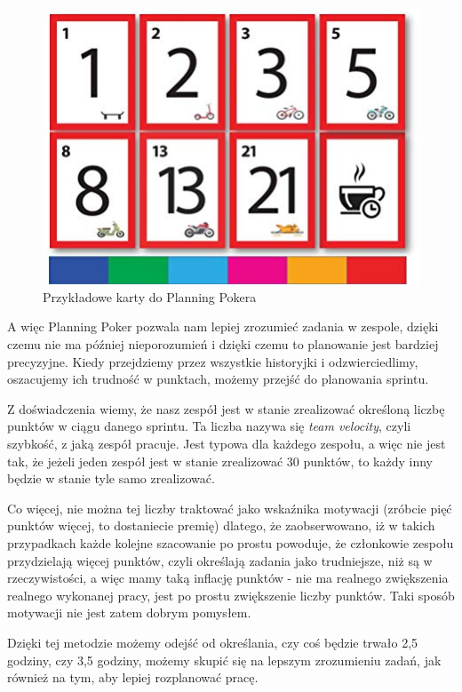 \begin{figure}
	\centering\includegraphics[width=.4\textwidth]{img/Planning_Poker}
	\caption{Przykładowe karty do Planning Pokera}\label{rysunek:poker}
\end{figure}

A więc Planning Poker pozwala nam lepiej zrozumieć zadania w zespole,
dzięki czemu nie ma później nieporozumień i dzięki czemu to planowanie jest bardziej precyzyjne.
Kiedy przejdziemy przez wszystkie historyjki i odzwierciedlimy, oszacujemy ich trudność w punktach,
możemy przejść do planowania sprintu.

Z doświadczenia wiemy, że nasz zespół jest w stanie zrealizować określoną liczbę punktów w ciągu danego sprintu.
Ta liczba nazywa się \textit{team velocity}, czyli szybkość, z jaką zespół pracuje.
Jest typowa dla każdego zespołu, a więc nie jest tak, że jeżeli jeden zespół
jest w stanie zrealizować 30 punktów, to każdy inny będzie w stanie tyle samo zrealizować.

Co więcej, nie można tej liczby traktować jako wskaźnika motywacji
(zróbcie pięć punktów więcej, to dostaniecie premię) dlatego,
że zaobserwowano, iż w takich przypadkach każde kolejne szacowanie po prostu powoduje,
że członkowie zespołu przydzielają więcej punktów, czyli określają zadania jako trudniejsze,
niż są w rzeczywistości, a więc mamy taką inflację punktów - nie ma realnego
zwiększenia realnego wykonanej pracy, jest po prostu zwiększenie liczby punktów.
Taki sposób motywacji nie jest zatem dobrym pomysłem.

Dzięki tej metodzie możemy odejść od określania, czy coś będzie trwało 2,5 godziny,
czy 3,5 godziny, możemy skupić się na lepszym zrozumieniu zadań,
jak również na tym, aby lepiej rozplanować pracę.
